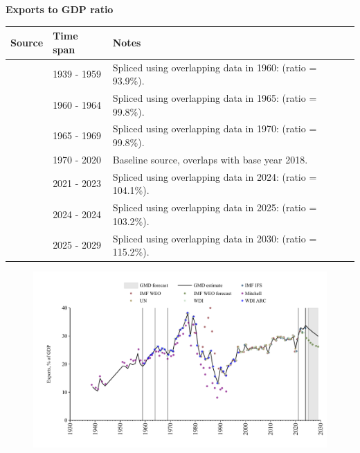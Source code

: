 \documentclass[12pt,a4paper,landscape]{article}
\begin{document}
\begin{adjustbox}{max totalsize={\paperwidth}{\paperheight},center}
\begin{minipage}[t][\textheight][t]{\textwidth}
\vspace*{0.5cm}
{}
\begin{center}
{\Large\bfseries Exports to GDP ratio}
\end{center}
\vspace{0.5cm}
\begin{table}[H]
\centering
\small
\begin{tabular}{|l|l|l|}
\hline
\textbf{Source} & \textbf{Time span} & \textbf{Notes} \\
\hline
\rowcolor{white}\cite{Mitchell}& 1939 - 1959 &Spliced using overlapping data in 1960: (ratio = 93.9\%). \\
\rowcolor{lightgray}\cite{WDI_ARC}& 1960 - 1964 &Spliced using overlapping data in 1965: (ratio = 99.8\%). \\
\rowcolor{white}\cite{WDI}& 1965 - 1969 &Spliced using overlapping data in 1970: (ratio = 99.8\%). \\
\rowcolor{lightgray}\cite{UN}& 1970 - 2020 &Baseline source, overlaps with base year 2018. \\
\rowcolor{white}\cite{WDI}& 2021 - 2023 &Spliced using overlapping data in 2024: (ratio = 104.1\%). \\
\rowcolor{lightgray}\cite{IMF_IFS}& 2024 - 2024 &Spliced using overlapping data in 2025: (ratio = 103.2\%). \\
\rowcolor{white}\cite{IMF_WEO_forecast}& 2025 - 2029 &Spliced using overlapping data in 2030: (ratio = 115.2\%). \\
\hline
\end{tabular}
\end{table}
\begin{figure}[H]
\centering
\includegraphics[width=\textwidth,height=0.6\textheight,keepaspectratio]{graphs/SLV_exports_GDP.pdf}
\end{figure}
\end{minipage}
\end{adjustbox}
\end{document}
